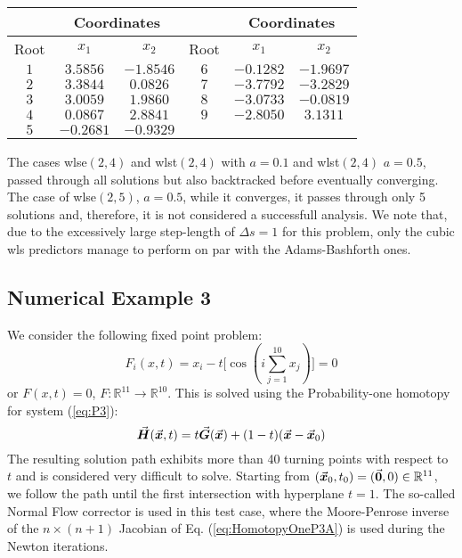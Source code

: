 \begin{table}[b]
	\centering
	\begin{minipage}{0.75\textwidth}
		\label{table:TABLE_CH5EX2_B}
		\small
		\renewcommand{\arraystretch}{1.25}
		\begin{tabular}{c c c c c c}
			\hline\hline
			& \multicolumn{2}{c}{Coordinates} & & 
			\multicolumn{2}{c}{Coordinates} \\
			\hline
			Root  & $x_1$ & $x_2$ &  Root  & $x_1$  & $x_2$ \\
			\hline
			$1$ & $3.5856$ & $-1.8546$ & $6$ & $-0.1282$ & $-1.9697$ \\
			$2$ & $3.3844$ & $0.0826$  & $7$ & $-3.7792$ & $-3.2829$ \\
			$3$ & $3.0059$ & $1.9860$  & $8$ & $-3.0733$ & $-0.0819$ \\
			$4$ & $0.0867$ & $2.8841$  & $9$ & $-2.8050$ & $3.1311$ \\
			$5$ & $-0.2681$ & $-0.9329$ &  &  &  \\
			\hline\hline
		\end{tabular}
	\end{minipage}
\end{table}
The cases \acrshort{wlse}$(2,4)$ and \acrshort{wlst}$(2,4)$ with $a=0.1$ and 
\acrshort{wlst}$(2,4)$ $a=0.5$,
passed through all solutions but also backtracked  before eventually converging.
The case of \acrshort{wlse}$(2,5)$, $a=0.5$, while it converges, it passes 
through only 5 
solutions and, therefore, it is not considered a successfull
analysis. We note that, due to the excessively large step-length of $\Delta
s=1$ for this problem, only the cubic \acrshort{wls} predictors manage to 
perform on par with the Adams-Bashforth ones. 

\subsection{Numerical Example 3}
We consider the following fixed point 
problem\cite{Watson79,Georg81,Schwetlick87}:
\begin{equation}
	F_i(x,t) = x_i-t\bigl[\cos(i\sum_{j=1}^{10} x_j)\bigr]=0
	\label{eq:P3}
\end{equation}
or $F(x,t)=0$, $F:\mathbb{R}^{11}\rightarrow\mathbb{R}^{10}$. This is 
solved using the Probability-one
homotopy\cite{Chow78,Watson:1990} for system (\ref{eq:P3}):
\begin{equation}
	\vec{\bm{H}}(\vec{\bm{x}},t)=t \vec{\bm{G}}(\vec{\bm{x}})+(1-t)(\vec{\bm{x}}-\vec{\bm{x}}_0)
	\label{eq:HomotopyOneP3A}
\end{equation}
The resulting solution path exhibits more than 40 turning points with respect to
$t$ and is considered very difficult to solve. Starting from
$(\vec{\bm{x}}_0,t_0)=(\vec{\bm{0}},0)\in\mathbb{R}^{11}$, we follow the path until the
first intersection with hyperplane $t=1$. The so-called Normal Flow
corrector\cite{Watson86} is used in this test case, where the Moore-Penrose 
inverse of the
$n\times(n+1)$ Jacobian of Eq. (\ref{eq:HomotopyOneP3A}) is used during the 
Newton 
iterations.


